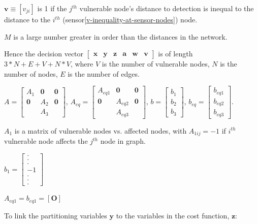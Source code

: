 \documentclass[authoryear,preprint,review,12pt]{elsarticle}
\begin{document}
$\mathbf{v}\equiv[v_{ji}]$ is 1 if the $j^{th}$ vulnerable node's
distance to detection is inequal to the distance to the $i^{th}$
(sensor\ref{v-inequality-at-sensor-nodes}) node.

$M$ is a large number greater in order than the distances in the
network.

Hence the decision vector $\left[\mathbf{\begin{array}{cccccc}
\mathbf{x} & y & z & a & w & \mathbf{v}\end{array}}\right]$ is of length $3*N+E+V+N*V$, where $V$ is the number of vulnerable
nodes, $N$ is the number of nodes, $E$ is the number of edges.

$A=\left[\begin{array}{ccc}
A_{1} & \mathbf{0} & \mathbf{0}\\
\mathbf{0} & A_{2} & \mathbf{0}\\
\mathbf{} & A_{3}
\end{array}\right]$, $A_{eq}=\left[\begin{array}{ccc}
A_{eq1} & \mathbf{0} & \mathbf{0}\\
\mathbf{0} & A_{eq2} & \mathbf{0}\\
 & A_{eq3}
\end{array}\right]$, $b=\left[\begin{array}{c}
b_{1}\\
b_{2}\\
b_{3}
\end{array}\right]$, $b_{eq}=\left[\begin{array}{c}
b_{eq1}\\
b_{eq2}\\
b_{eq3}
\end{array}\right]$.

$A_{1}$ is a matrix of vulnerable nodes vs. affected nodes, with
$A_{1ij}=-1$ if $i^{th}$ vulnerable node affects the $j^{th}$ node
in graph.

$b_{1}=\left[\begin{array}{c}
.\\
.\\
.\\
-1\\
.\\
.\\
.
\end{array}\right]$

$A_{eq1}=b_{eq1}=\mathbf{\left[O\right]}$

To link the partitioning variables $\mathbf{y}$ to the variables
in the cost function, $\mathbf{z}$:
\end{document}
